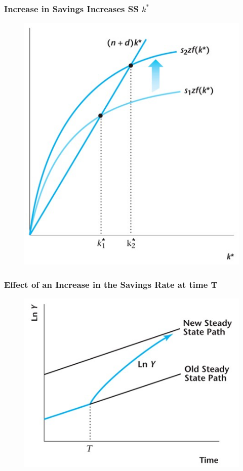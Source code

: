 \documentclass{beamer}
\begin{document}
\begin{frame}
\frametitle[alignment=center]{Increase in Savings Increases SS $k^*$}
\begin{figure}
\centering
\includegraphics[scale=0.5]{Figures/W_Fig_7pt15.png}
\end{figure}
\end{frame}


\begin{frame}
\frametitle[alignment=center]{Effect of an Increase in the Savings Rate at time T}
\begin{figure}
\centering
\includegraphics[scale=0.5]{Figures/W_Fig_7pt16.png}
\end{figure}
\end{frame}
\end{document}
